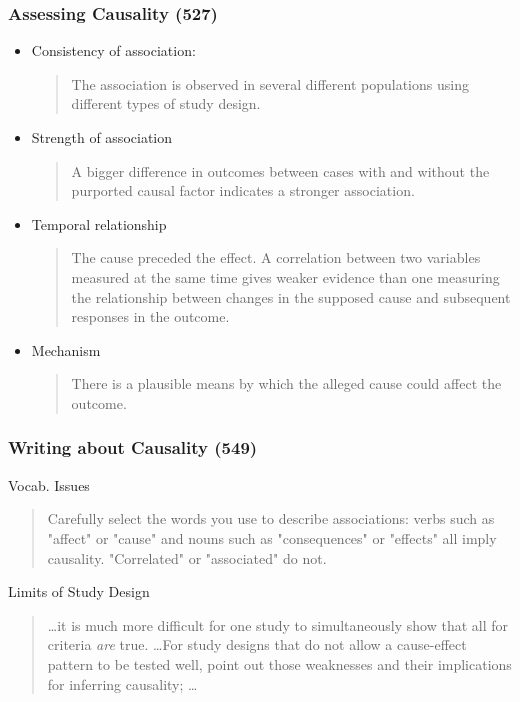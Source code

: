 \documentclass[hyperref={colorlinks=false},handout,10pt]{beamer}
\let\olditem\item
\renewcommand{\item}{\setlength{\itemsep}{0.5\baselineskip}\olditem}
\begin{document}
\begin{frame}
    \frametitle{Assessing Causality (527)}
    \begin{itemize}
        \item Consistency of association: 
            \begin{verse}
The association is observed in several different
populations using different types of study design. 
\end{verse}
        \item Strength of association
            \begin{verse}
A bigger difference in outcomes between cases with and without the purported
causal factor indicates a stronger association.
\end{verse}
        \item Temporal relationship
            \begin{verse}
The
cause preceded the effect. A correlation between two variables measured at the
same time gives weaker evidence than one measuring the relationship between
changes in the supposed cause and subsequent responses in the outcome. 
\end{verse}
        \item Mechanism
            \begin{verse}
There is a plausible means by which the alleged cause could affect
the outcome.
\end{verse}
    \end{itemize}
\end{frame}

\begin{frame}
    \frametitle{Writing about Causality (549)}
    \begin{block}{Vocab. Issues}
        \begin{verse}
           Carefully select the words you use to describe associations: verbs such as "affect" or "cause" and nouns such as "consequences" or "effects" all imply causality. "Correlated" or "associated" do not.
        \end{verse}
    \end{block}
   
    \begin{block}{Limits of Study Design}
        \begin{verse}
            \ldots it is much more difficult for one study to simultaneously
            show that all for criteria \emph{are} true.  \ldots For study
            designs that do not allow a cause-effect pattern to be tested
            well, point out those weaknesses and their implications for
            inferring causality; \ldots
        \end{verse}
    \end{block}
    
\end{frame}
\end{document}
